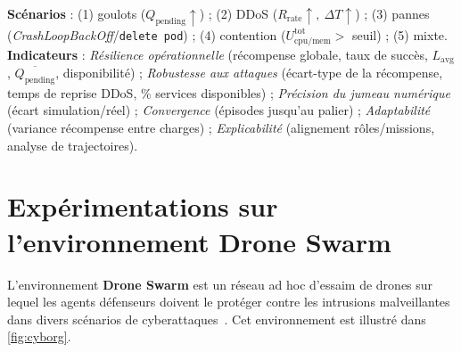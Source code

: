 \textbf{Scénarios} : (1) goulots (\(Q_{\text{pending}}\uparrow\)) ; (2) DDoS (\(R_{\text{rate}}\uparrow,\ \Delta T\uparrow\)) ; (3) pannes (\textit{CrashLoopBackOff}/\texttt{delete pod}) ; (4) contention (\(U_{\text{cpu/mem}}^{\text{tot}}>\) seuil) ; (5) mixte. \textbf{Indicateurs} : \emph{Résilience opérationnelle} (récompense globale, taux de succès, \(L_{\text{avg}}\), \(\overline{Q_{\text{pending}}}\), disponibilité) ; \emph{Robustesse aux attaques} (écart-type de la récompense, temps de reprise DDoS, \% services disponibles) ; \emph{Précision du jumeau numérique} (écart simulation/réel) ; \emph{Convergence} (épisodes jusqu’au palier) ; \emph{Adaptabilité} (variance récompense entre charges) ; \emph{Explicabilité} (alignement rôles/missions, analyse de trajectoires).




\section{Expérimentations sur l'environnement Drone Swarm}

L'environnement \textbf{Drone Swarm} est un réseau ad hoc d'essaim de drones sur lequel les agents défenseurs doivent le protéger contre les intrusions malveillantes dans divers scénarios de cyberattaques~\cite{Standen2021}. Cet environnement est illustré dans \autoref{fig:cyborg}.

